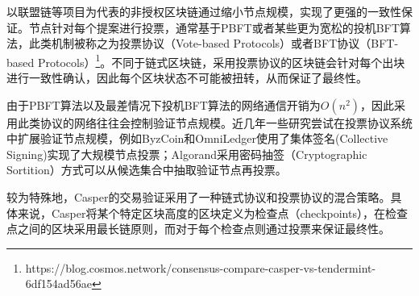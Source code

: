 
以联盟链等项目为代表的非授权区块链通过缩小节点规模，实现了更强的一致性保证。节点针对每个提案进行投票，通常基于PBFT\cite{castro1999practical}或者某些更为宽松的投机BFT算法\cite{kotla2007zyzzyva}，此类机制被称之为投票协议（Vote-based Protocols）或者BFT协议（BFT-based Protocols）\footnote{https://blog.cosmos.network/consensus-compare-casper-vs-tendermint-6df154ad56ae}。不同于链式区块链，采用投票协议的区块链会针对每个出块进行一致性确认，因此每个区块状态不可能被扭转，从而保证了最终性。

由于PBFT算法以及最差情况下投机BFT算法的网络通信开销为$O(n^2)$，因此采用此类协议的网络往往会控制验证节点规模\cite{castro1999practical,kotla2007zyzzyva}。近几年一些研究尝试在投票协议系统中扩展验证节点规模，例如ByzCoin\cite{kogias2016enhancing}和OmniLedger\cite{kokoris2018omniledger}使用了集体签名(Collective Signing)实现了大规模节点投票；Algorand\cite{gilad2017algorand}采用密码抽签（Cryptographic Sortition）方式可以从候选集合中抽取验证节点再投票。

较为特殊地，Casper\cite{buterin2017casper}的交易验证采用了一种链式协议和投票协议的混合策略。具体来说，Casper将某个特定区块高度的区块定义为检查点（checkpoints），在检查点之间的区块采用最长链原则，而对于每个检查点则通过投票来保证最终性。













